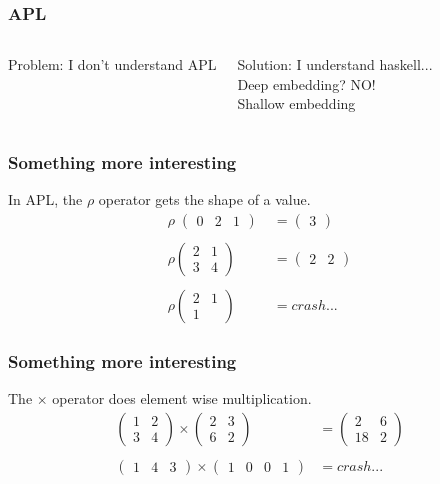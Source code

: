 \documentclass{beamer}
\begin{document}
\begin{frame}
    \frametitle{APL}
    \begin{columns}
            Problem: I don't understand APL\\

        \pause

            Solution: I understand haskell...\\
            Deep embedding? NO!\\
            Shallow embedding
    \end{columns}
\end{frame}

\begin{frame}
    \frametitle{Something more interesting}
        In APL, the $\rho$ operator gets the shape of a value.\\
        \begin{align*}
        \rho\;\begin{pmatrix} 0 & 2 & 1 \end{pmatrix}\; &= \begin{pmatrix}3\end{pmatrix}\\\\
            \rho \begin{pmatrix} 2 & 1 \\ 3 & 4 \end{pmatrix} &= \begin{pmatrix} 2 & 2\end{pmatrix}\\\\
            \rho \begin{pmatrix} 2 & 1 \\ 1 \end{pmatrix} &= crash...
        \end{align*}
\end{frame}

\begin{frame}
    \frametitle{Something more interesting}
        The $\times$ operator does element wise multiplication.\\
        \begin{align*}
            \begin{pmatrix} 1 & 2\\3 & 4\end{pmatrix} \times \begin{pmatrix} 2 & 3\\6 & 2\end{pmatrix} &=
            \begin{pmatrix} 2 & 6\\18 & 2\end{pmatrix}\\\\
            \begin{pmatrix} 1 & 4 & 3 \end{pmatrix} \times \begin{pmatrix}1 & 0 & 0 & 1 \end{pmatrix} &= crash...
        \end{align*}
\end{frame}
\end{document}
